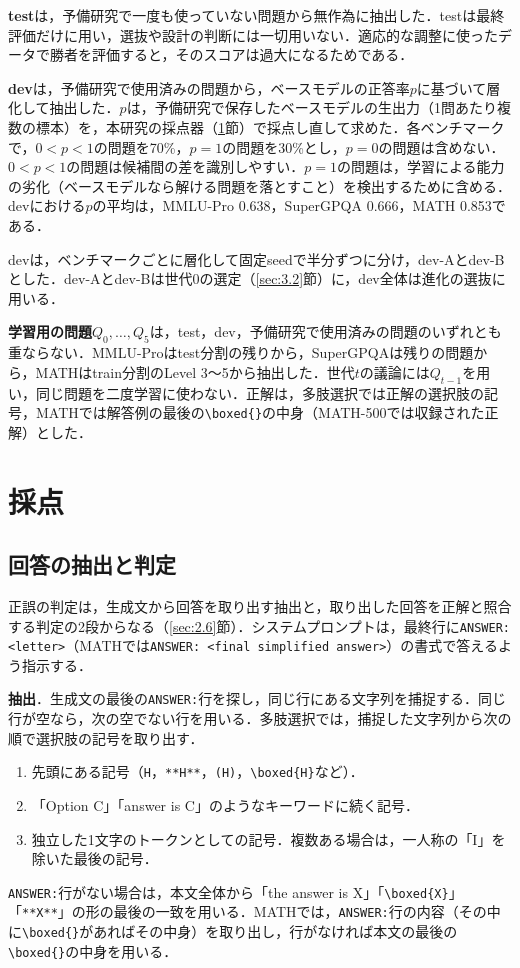 \textbf{test}は，予備研究で一度も使っていない問題から無作為に抽出した．testは最終評価だけに用い，選抜や設計の判断には一切用いない．適応的な調整に使ったデータで勝者を評価すると，そのスコアは過大になるためである\cite{xu2026siren}．

\textbf{dev}は，予備研究で使用済みの問題から，ベースモデルの正答率$p$に基づいて層化して抽出した．$p$は，予備研究で保存したベースモデルの生出力（1問あたり複数の標本）を，本研究の採点器（\ref{sec:4.3}節）で採点し直して求めた．各ベンチマークで，$0 < p < 1$の問題を70\%，$p = 1$の問題を30\%とし，$p = 0$の問題は含めない．$0 < p < 1$の問題は候補間の差を識別しやすい．$p = 1$の問題は，学習による能力の劣化（ベースモデルなら解ける問題を落とすこと）を検出するために含める．devにおける$p$の平均は，MMLU-Pro 0.638，SuperGPQA 0.666，MATH 0.853である．

devは，ベンチマークごとに層化して固定seedで半分ずつに分け，dev-Aとdev-Bとした．dev-Aとdev-Bは世代0の選定（\ref{sec:3.2}節）に，dev全体は進化の選抜に用いる．

\textbf{学習用の問題}$Q_0, \dots, Q_5$は，test，dev，予備研究で使用済みの問題のいずれとも重ならない．MMLU-Proはtest分割の残りから，SuperGPQAは残りの問題から，MATHはtrain分割のLevel 3〜5から抽出した．世代$t$の議論には$Q_{t-1}$を用い，同じ問題を二度学習に使わない．正解は，多肢選択では正解の選択肢の記号，MATHでは解答例の最後の\verb|\boxed{}|の中身（MATH-500では収録された正解）とした．

\section{採点}
\label{sec:4.3}

\subsection{回答の抽出と判定}
\label{sec:4.3.1}

正誤の判定は，生成文から回答を取り出す抽出と，取り出した回答を正解と照合する判定の2段からなる（\ref{sec:2.6}節）．システムプロンプトは，最終行に\texttt{ANSWER: <letter>}（MATHでは\texttt{ANSWER: <final simplified answer>}）の書式で答えるよう指示する．

\textbf{抽出}．生成文の最後の\texttt{ANSWER:}行を探し，同じ行にある文字列を捕捉する．同じ行が空なら，次の空でない行を用いる．多肢選択では，捕捉した文字列から次の順で選択肢の記号を取り出す．
\begin{enumerate}
\item 先頭にある記号（\texttt{H}，\texttt{**H**}，\texttt{(H)}，\verb|\boxed{H}|など）．
\item 「Option C」「answer is C」のようなキーワードに続く記号．
\item 独立した1文字のトークンとしての記号．複数ある場合は，一人称の「I」を除いた最後の記号．
\end{enumerate}
\texttt{ANSWER:}行がない場合は，本文全体から「the answer is X」「\verb|\boxed{X}|」「\texttt{**X**}」の形の最後の一致を用いる．MATHでは，\texttt{ANSWER:}行の内容（その中に\verb|\boxed{}|があればその中身）を取り出し，行がなければ本文の最後の\verb|\boxed{}|の中身を用いる．


